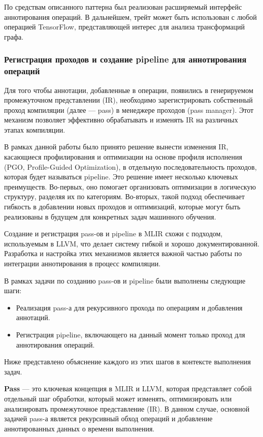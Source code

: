 По средствам описанного паттерна был реализован расширяемый интерфейс аннотирования операций.
В дальнейшем, трейт может быть использован с любой операцией TensorFlow, представляющей интерес для анализа трансформаций графа.

\subsubsection{Регистрация проходов и создание pipeline для аннотирования операций}

Для того чтобы аннотации, добавленные в операции, появились в генерируемом промежуточном представлении (IR), необходимо зарегистрировать собственный проход компиляции (далее — pass) в менеджере проходов (pass manager).
Этот механизм позволяет эффективно обрабатывать и изменять IR на различных этапах компиляции.

В рамках данной работы было принято решение вынести изменения IR, касающиеся профилирования и оптимизации на основе профиля исполнения (PGO, Profile-Guided Optimization), в отдельную последовательность проходов, которая будет называться pipeline.
Это решение имеет несколько ключевых преимуществ. Во-первых, оно помогает организовать оптимизации в логическую структуру, разделяя их по категориям. Во-вторых, такой подход обеспечивает гибкость в добавлении новых проходов и оптимизаций, которые могут быть реализованы в будущем для конкретных задач машинного обучения.

Создание и регистрация pass-ов и pipeline в MLIR схожи с подходом, используемым в LLVM, что делает систему гибкой и хорошо документированной.
Разработка и настройка этих механизмов является важной частью работы по интеграции аннотирования в процесс компиляции.

В рамках задачи по созданию pass-ов и pipeline были выполнены следующие шаги:

\begin{itemize}
\item Реализация pass-а для рекурсивного прохода по операциям и добавления аннотаций.
\item Регистрация pipeline, включающего на данный момент только проход для аннотирования операций.
\end{itemize}

Ниже представлено объяснение каждого из этих шагов в контексте выполнения задач.

\textbf{Pass} — это ключевая концепция в MLIR и LLVM, которая представляет собой отдельный шаг обработки, который может изменять, оптимизировать или анализировать промежуточное представление (IR).
 В данном случае, основной задачей pass-а является рекурсивный обход операций и добавление аннотированных данных о времени выполнения.

